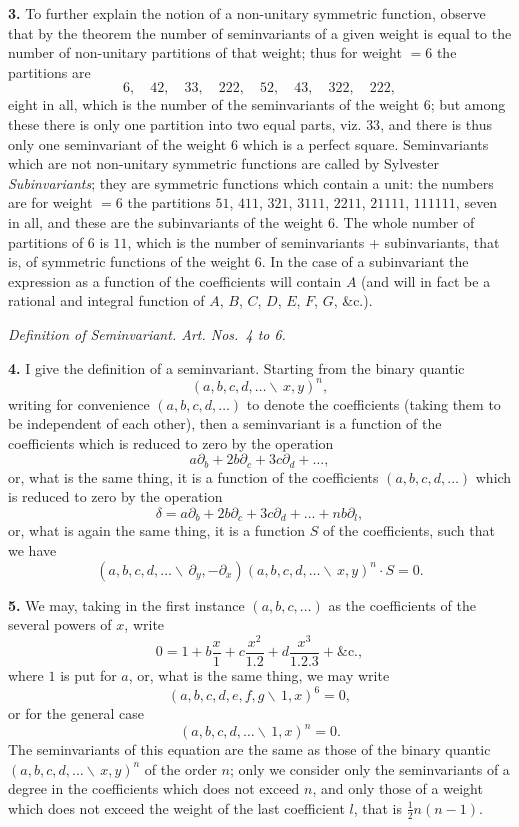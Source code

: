 \documentclass[11pt,a4paper]{book}
\begin{document}
\noindent\textbf{3.} To further explain the notion of a non-unitary symmetric function, observe that by the theorem the number of seminvariants of a given weight is equal to the number of non-unitary partitions of that weight; thus for weight $= 6$ the partitions are
\[
6,\quad 42,\quad 33,\quad 222,\quad 52,\quad 43,\quad 322,\quad 222,
\]
eight in all, which is the number of the seminvariants of the weight $6$; but among these there is only one partition into two equal parts, viz. $33$, and there is thus only one seminvariant of the weight $6$ which is a perfect square. Seminvariants which are not non-unitary symmetric functions are called by Sylvester \textit{Subinvariants}; they are symmetric functions which contain a unit: the numbers are for weight $= 6$ the partitions $51$, $411$, $321$, $3111$, $2211$, $21111$, $111111$, seven in all, and these are the subinvariants of the weight $6$. The whole number of partitions of $6$ is $11$, which is the number of seminvariants + subinvariants, that is, of symmetric functions of the weight $6$. In the case of a subinvariant the expression as a function of the coefficients will contain $A$ (and will in fact be a rational and integral function of $A$, $B$, $C$, $D$, $E$, $F$, $G$, \&c.).

\begin{center}
\textit{Definition of Seminvariant. Art. Nos.~4 to 6.}
\end{center}

\noindent\textbf{4.} I give the definition of a seminvariant. Starting from the binary quantic
\[
(a, b, c, d, \dots \!\!\!\backslash\, x, y)^n,
\]
writing for convenience $(a, b, c, d, \dots)$ to denote the coefficients (taking them to be independent of each other), then a seminvariant is a function of the coefficients which is reduced to zero by the operation
\[
a\partial_b + 2b\partial_c + 3c\partial_d + \dots,
\]
or, what is the same thing, it is a function of the coefficients $(a, b, c, d, \dots)$ which is reduced to zero by the operation
\[
\delta = a\partial_b + 2b\partial_c + 3c\partial_d + \dots + nb\partial_l,
\]
or, what is again the same thing, it is a function $S$ of the coefficients, such that we have
\[
(a, b, c, d, \dots \!\!\!\backslash\, \partial_y, -\partial_x)(a, b, c, d, \dots \!\!\!\backslash\, x, y)^n \cdot S = 0.
\]

\noindent\textbf{5.} We may, taking in the first instance $(a, b, c, \dots)$ as the coefficients of the several powers of $x$, write
\[
0 = 1 + b\frac{x}{1} + c\frac{x^2}{1.2} + d\frac{x^3}{1.2.3} + \&\text{c.},
\]
where $1$ is put for $a$, or, what is the same thing, we may write
\[
(a, b, c, d, e, f, g \!\!\!\backslash\, 1, x)^6 = 0,
\]
or for the general case
\[
(a, b, c, d, \dots \!\!\!\backslash\, 1, x)^n = 0.
\]
The seminvariants of this equation are the same as those of the binary quantic $(a, b, c, d, \dots \!\!\!\backslash\, x, y)^n$ of the order $n$; only we consider only the seminvariants of a degree in the coefficients which does not exceed $n$, and only those of a weight which does not exceed the weight of the last coefficient $l$, that is $\frac{1}{2}n(n-1)$.
\end{document}
